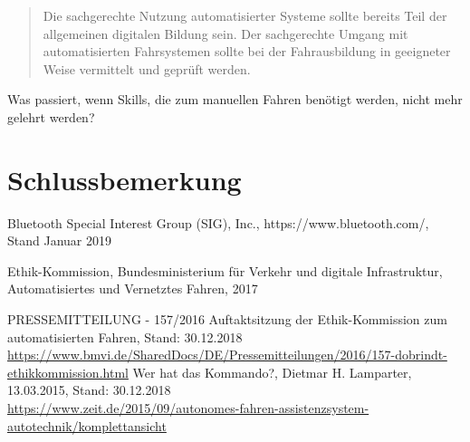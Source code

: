 \documentclass[twoside,a4paper,12pt]{article}
\begin{document}
\begin{quote}
\glqq
Die sachgerechte Nutzung automatisierter Systeme sollte bereits Teil der allgemeinen digitalen Bildung sein. Der sachgerechte 
Umgang mit automatisierten Fahrsystemen sollte
bei der Fahrausbildung in geeigneter Weise vermittelt und geprüft werden.\grqq\mbox{~\cite[S. 13]{ek}}
\end{quote}

Was passiert, wenn Skills, die zum manuellen Fahren benötigt werden, nicht mehr gelehrt werden?

\newpage

\cleardoublepage
\section{Schlussbemerkung}

\newpage

\cleardoublepage
\begin{thebibliography}{99}

 Bluetooth Special Interest Group (SIG), Inc., https://www.bluetooth.com/, Stand Januar 2019

 Ethik-Kommission, Bundesministerium für Verkehr und digitale Infrastruktur, Automatisiertes und
Vernetztes Fahren, 2017

 PRESSEMITTEILUNG - 157/2016 Auftaktsitzung der Ethik-Kommission zum automatisierten Fahren, Stand: 30.12.2018\\ \url{https://www.bmvi.de/SharedDocs/DE/Pressemitteilungen/2016/157-dobrindt-ethikkommission.html}
 Wer hat das Kommando?, Dietmar H. Lamparter, 13.03.2015, Stand: 30.12.2018 \\ \url{https://www.zeit.de/2015/09/autonomes-fahren-assistenzsystem-autotechnik/komplettansicht}


\end{thebibliography}

\newpage
\end{document}
